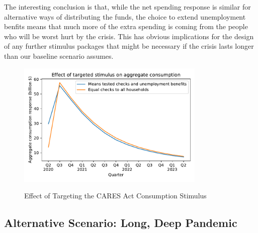 The interesting conclusion is that, while the net spending response is similar for alternative ways of distributing the funds, the choice to extend unemployment benfits means that much more of the extra spending is coming from the people who will be worst hurt by the crisis.  This has obvious implications for the design of any further stimulus packages that might be necessary if the crisis lasts longer than our baseline scenario assumes.

\begin{figure}
	\centering
	\caption{Effect of Targeting the CARES Act Consumption Stimulus}
	\label{EffectTargeting}
	{ \includegraphics[width=0.8\textwidth]{./Figures/EffectTargeting}}
\end{figure}


\subsection{Alternative Scenario: Long, Deep Pandemic} \label{sec:longPandemic}

